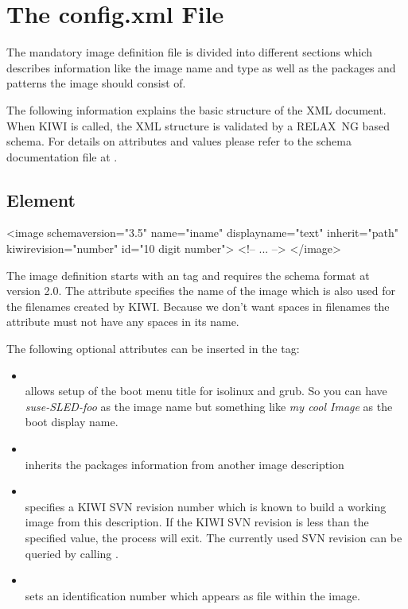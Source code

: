 \section{The config.xml File}
The mandatory image definition file is divided into different sections
which describes information like the image name and type as well as
the packages and patterns the image should consist of.

The following information explains the basic structure of the XML document. When KIWI
is called, the XML structure is validated by a RELAX~NG based schema.
For details on attributes and values please refer to the schema
documentation file at .

\subsection{ Element}
\begin{xml}
<image schemaversion="3.5" name="iname"
 displayname="text"
 inherit="path" kiwirevision="number"
 id="10 digit number">
  <!-- ... -->
</image>
\end{xml}

The image definition starts with an  tag and requires the
schema format at version 2.0. The attribute  specifies the
name of the image which is also used for the filenames created
by KIWI. Because we don't want spaces in filenames the 
attribute must not have any spaces in its name.

The following optional attributes can be inserted in the  tag:
\begin{itemize}
\item {}\\
      allows setup of the boot
      menu title for isolinux and grub. So you can have
      \textit{suse-SLED-foo} as the image name but something like
      \textit{my cool Image} as the boot display name.

\item {} \\
      inherits the packages information from another image description

\item {} \\
      specifies a KIWI SVN revision number which is known to build
      a working image from this description. If the KIWI SVN
      revision is less than the specified value, the
      process will exit. The currently used SVN revision can
      be queried by calling  .

\item {}\\
      sets an identification
      number which appears as file  within the
      image.
\end{itemize}

